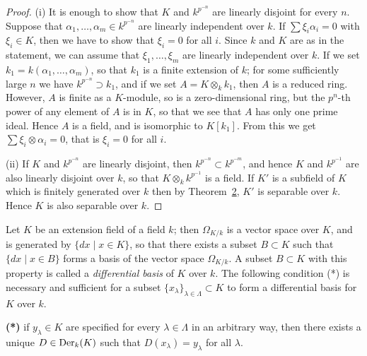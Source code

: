 \begin{proof}
(i) It is enough to show that $K$ and $k^{p^{-n}}$ are linearly disjoint for every $n$.
Suppose that $\alpha_1, \ldots, \alpha_m \in k^{p^{-n}}$ are linearly independent over $k$. If
$\sum \xi_i\alpha_i = 0$ with $\xi_i \in K$, then we have to show that $\xi_i = 0$ for all $i$. Since
$k$ and $K$ are as in the statement, we can assume that $\xi_1, \ldots, \xi_m$ are
linearly independent over $k$. If we set $k_1 = k(\alpha_1, \ldots, \alpha_m)$, so that $k_1$ is a
finite extension of $k$; for some sufficiently large $n$ we have $k^{p^{-n}} \supset k_1$, and
if we set $A = K \otimes_k k_1$, then $A$ is a reduced ring. However, $A$ is finite as a
$K$-module, so is a zero-dimensional ring, but the $p^n$-th power of any element of
$A$ is in $K$, so that we see that $A$ has only one prime ideal. Hence $A$ is a field,
and is isomorphic to $K[k_1]$. From this we get $\sum \xi_i \otimes \alpha_i = 0$, that is
$\xi_i = 0$ for all $i$.

(ii) If $K$ and $k^{p^{-n}}$ are linearly disjoint, then $k^{p^{-n}} \subset k^{p^{-m}}$, and hence
$K$ and $k^{p^{-1}}$ are also linearly disjoint over $k$, so that $K \otimes_k k^{p^{-1}}$ is a
field. If $K'$ is a subfield of $K$ which is finitely generated over $k$ then by
Theorem~\hyperref[thm:26.2]{2}, $K'$ is separable over $k$. Hence $K$ is also separable over $k$.
\end{proof}

Let $K$ be an extension field of a field $k$; then $\Omega_{K/k}$ is a vector space over
$K$, and is generated by $\{dx \mid x \in K\}$, so that there exists a subset $B \subset K$
such that $\{dx \mid x \in B\}$ forms a basis of the vector space $\Omega_{K/k}$. A subset
$B \subset K$ with this property is called a \emph{differential basis} of $K$ over $k$. The
following condition (*) is necessary and sufficient for a subset
$\{x_\lambda\}_{\lambda \in \Lambda} \subset K$ to form a differential basis for $K$ over $k$.

\textbf{(*)} if $y_\lambda \in K$ are specified for every $\lambda \in \Lambda$ in an arbitrary way, then
there exists a unique $D \in \operatorname{Der}_k(K)$ such that $D(x_\lambda) = y_\lambda$ for all $\lambda$.

